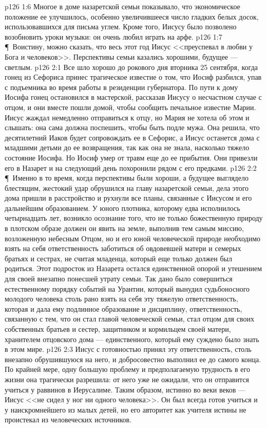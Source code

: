 \vs p126 1:6 Многое в доме назаретской семьи показывало, что экономическое положение ее улучшилось, особенно увеличившееся число гладких белых досок, использовавшихся для письма углем. Кроме того, Иисусу было позволено возобновить уроки музыки: он очень любил играть на арфе.
\vs p126 1:7 \P\ Воистину, можно сказать, что весь этот год Иисус <<преуспевал в любви у Бога и человеков>>. Перспективы семьи казались хорошими, будущее --- светлым.
\vs p126 2:1 Все шло хорошо до рокового дня вторника 25 сентября, когда гонец из Сефориса принес трагическое известие о том, что Иосиф разбился, упав с подъемника во время работы в резиденции губернатора. По пути к дому Иосифа гонец остановился в мастерской, рассказав Иисусу о несчастном случае с отцом, и они вместе пошли домой, чтобы сообщить печальное известие Марии. Иисус жаждал немедленно отправиться к отцу, но Мария не хотела об этом и слышать: она сама должна поспешить, чтобы быть подле мужа. Она решила, что десятилетний Иаков будет сопровождать ее в Сефорис, а Иисус останется дома с младшими детьми до ее возвращения, так как она не знала, насколько тяжело состояние Иосифа. Но Иосиф умер от травм еще до ее прибытия. Они привезли его в Назарет и на следующий день похоронили рядом с его предками.
\vs p126 2:2 \P\ Именно в то время, когда перспективы были хороши, а будущее выглядело блестящим, жестокий удар обрушился на главу назаретской семьи, дела этого дома пришли в расстройство и рухнули все планы, связанные с Иисусом и его дальнейшим образованием. У юного плотника, которому едва исполнилось четырнадцать лет, возникло осознание того, что не только божественную природу в плотском образе должен он явить на земле, выполнив тем самым миссию, возложенную небесным Отцом, но и его юной человеческой природе необходимо взять на себя ответственность заботиться об овдовевшей матери и семерых братьях и сестрах, не считая младенца, который еще только должен был родиться. Этот подросток из Назарета остался единственной опорой и утешением для своей внезапно понесшей утрату семьи. Так дано было совершиться естественному порядку событий на Урантии, который вынудил судьбоносного молодого человека столь рано взять на себя эту тяжелую ответственность, которая и дала ему подлинное образование и дисциплину, ответственность, связанную с тем, что он стал главой человеческой семьи, стал отцом для своих собственных братьев и сестер, защитником и кормильцем своей матери, хранителем отцовского дома --- единственного, который ему суждено было знать в этом мире.
\vs p126 2:3 Иисус с готовностью принял эту ответственность, столь внезапно обрушившуюся на него, и добросовестно выполнил ее до самого конца. По крайней мере, одну большую проблему и предполагаемую трудность в его жизни она трагически разрешила: от него уже не ожидали, что он отправится учиться у раввинов в Иерусалиме. Таким образом, истинно во веки веков --- Иисус <<не сидел у ног ни одного человека>>. Он был всегда готов учиться и у наискромнейшего из малых детей, но его авторитет как учителя истины не проистекал из человеческих источников.
